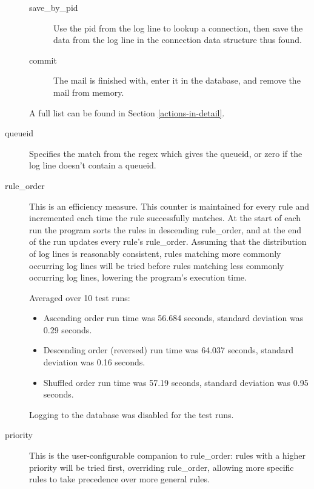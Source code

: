 \documentclass[a4paper,12pt,draft]{article}
\begin{document}
\begin{description}
\begin{description}
            \item [save\_by\_pid] Use the pid from the log line to lookup a
                connection, then save the data from the log line in the
                connection data structure thus found.

            \item [commit] The mail is finished with, enter it in the
                database, and remove the mail from memory.

        \end{description}

        A full list can be found in Section \ref{actions-in-detail}.

    \item [queueid] Specifies the match from the regex which gives the
        queueid, or zero if the log line doesn't contain a queueid.

    \item [rule\_order] This is an efficiency measure.  This counter is
        maintained for every rule and incremented each time the rule
        successfully matches.  At the start of each run the program sorts
        the rules in descending rule\_order, and at the end of the run
        updates every rule's rule\_order.  Assuming that the 
        distribution of log lines is reasonably consistent, rules matching
        more commonly occurring log lines will be tried before rules
        matching less commonly occurring log lines, lowering the program's
        execution time.

        Averaged over 10 test runs:

        \begin{itemize} 

            \item Ascending order run time was 56.684 seconds, standard
                deviation was 0.29 seconds.

            \item Descending order (reversed) run time was 64.037 seconds,
                standard deviation was 0.16 seconds.

            \item Shuffled order run time was 57.19 seconds, standard
                deviation was 0.95 seconds.

        \end{itemize}

        Logging to the database was disabled for the test runs.

    \item [priority] This is the user-configurable companion to
        rule\_order: rules with a higher priority will be tried first,
        overriding rule\_order, allowing more specific rules to take
        precedence over more general rules.

\end{description}
\end{document}
